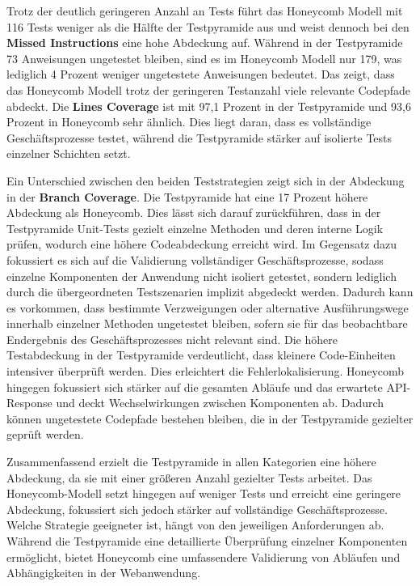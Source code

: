 Trotz der deutlich geringeren Anzahl an Tests führt das Honeycomb Modell mit 116 Tests weniger als die Hälfte der Testpyramide aus und weist dennoch bei den \textbf{Missed Instructions} eine hohe Abdeckung auf. Während in der Testpyramide 73 Anweisungen ungetestet bleiben, sind es im Honeycomb Modell nur 179, was lediglich 4 Prozent weniger ungetestete Anweisungen bedeutet. Das zeigt, dass das Honeycomb Modell trotz der geringeren Testanzahl viele relevante Codepfade abdeckt.  Die \textbf{Lines Coverage} ist mit 97,1 Prozent in der Testpyramide und 93,6 Prozent in Honeycomb sehr ähnlich. Dies liegt daran, dass es vollständige Geschäftsprozesse testet, während die Testpyramide stärker auf isolierte Tests einzelner Schichten setzt.

Ein Unterschied zwischen den beiden Teststrategien zeigt sich in der Abdeckung in der \textbf{Branch Coverage}. Die Testpyramide hat eine 17 Prozent höhere Abdeckung als Honeycomb. Dies lässt sich darauf zurückführen, dass in der Testpyramide Unit-Tests gezielt einzelne Methoden und deren interne Logik prüfen, wodurch eine höhere Codeabdeckung erreicht wird. Im Gegensatz dazu fokussiert es sich auf die Validierung vollständiger Geschäftsprozesse, sodass einzelne Komponenten der Anwendung nicht isoliert getestet, sondern lediglich durch die übergeordneten Testszenarien implizit abgedeckt werden. Dadurch kann es vorkommen, dass bestimmte Verzweigungen oder alternative Ausführungswege innerhalb einzelner Methoden ungetestet bleiben, sofern sie für das beobachtbare Endergebnis des Geschäftsprozesses nicht relevant sind. Die höhere Testabdeckung in der Testpyramide verdeutlicht, dass kleinere Code-Einheiten intensiver überprüft werden. Dies erleichtert die Fehlerlokalisierung. Honeycomb hingegen fokussiert sich stärker auf die gesamten Abläufe und das erwartete API-Response und deckt Wechselwirkungen zwischen Komponenten ab. Dadurch können ungetestete Codepfade bestehen bleiben, die in der Testpyramide gezielter geprüft werden.

Zusammenfassend erzielt die Testpyramide in allen Kategorien eine höhere Abdeckung, da sie mit einer größeren Anzahl gezielter Tests arbeitet. Das Honeycomb-Modell setzt hingegen auf weniger Tests und erreicht eine geringere Abdeckung, fokussiert sich jedoch stärker auf vollständige Geschäftsprozesse. Welche Strategie geeigneter ist, hängt von den jeweiligen Anforderungen ab. Während die Testpyramide eine detaillierte Überprüfung einzelner Komponenten ermöglicht, bietet Honeycomb eine umfassendere Validierung von Abläufen und Abhängigkeiten in der Webanwendung.

